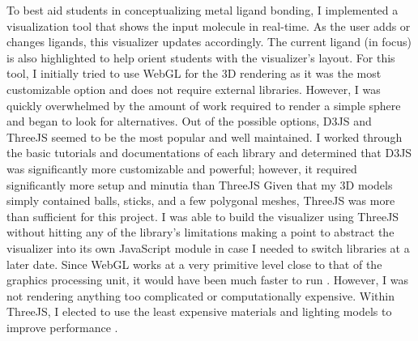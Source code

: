 \documentclass[10pt,twocolumn]{article}
\begin{document}
To best aid students in conceptualizing metal ligand bonding, I implemented a visualization tool that shows the input molecule in real-time. As the user adds or changes ligands, this visualizer updates accordingly. The current ligand (in focus) is also highlighted to help orient students with the visualizer’s layout. For this tool, I initially tried to use WebGL for the 3D rendering as it was the most customizable option and does not require external libraries. However, I was quickly overwhelmed by the amount of work required to render a simple sphere and began to look for alternatives. Out of the possible options, D3JS and ThreeJS seemed to be the most popular and well maintained. I worked through the basic tutorials and documentations of each library and determined that D3JS was significantly more customizable and powerful; however, it required significantly more setup and minutia than ThreeJS \cite{threejs,d3} Given that my 3D models simply contained balls, sticks, and a few polygonal meshes, ThreeJS was more than sufficient for this project. I was able to build the visualizer using ThreeJS without hitting any of the library’s limitations making a point to abstract the visualizer into its own JavaScript module in case I needed to switch libraries at a later date. Since WebGL works at a very primitive level close to that of the graphics processing unit, it would have been much faster to run \cite{threejs_vs_webgl}. However, I was not rendering anything too complicated or computationally expensive. Within ThreeJS, I elected to use the least expensive materials and lighting models to improve performance \cite{threejs}.
\end{document}

